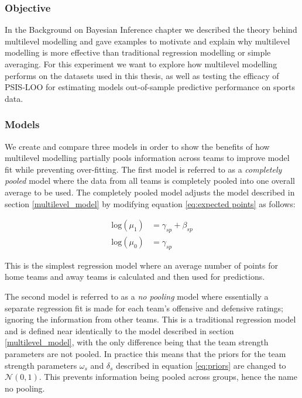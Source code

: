\subsubsection*{Objective}

In the Background on Bayesian Inference chapter we described the theory behind multilevel modelling and gave examples to motivate and explain why multilevel modelling is more effective than traditional regression modelling or simple averaging. For this experiment we want to explore how multilevel modelling performs on the datasets used in this thesis, as well as testing the efficacy of PSIS-LOO for estimating models out-of-sample predictive performance on sports data.

\subsubsection*{Models}

We create and compare three models in order to show the benefits of how multilevel modelling partially pools information across teams to improve model fit while preventing over-fitting. The first model is referred to as a \textit{completely pooled} model where the data from all teams is completely pooled into one overall average to be used. The completely pooled model adjusts the model described in section \ref{multilevel_model} by modifying equation \ref{eq:expected points} as follows:

\begin{equation} \label{eq:cp_model}
\begin{split}
\text{log}(\mu_{1}) &= \gamma_{sp} + \beta_{sp} \\
\text{log}(\mu_{0}) &= \gamma_{sp}
\end{split}
\end{equation}

This is the simplest regression model where an average number of points for home teams and away teams is calculated and then used for predictions.

The second model is referred to as a \textit{no pooling} model where essentially a separate regression fit is made for each team's offensive and defensive ratings; ignoring the information from other teams. This is a traditional regression model and is defined near identically to the model described in section \ref{multilevel_model}, with the only difference being that the team strength parameters are not pooled. In practice this means that the priors for the team strength parameters $\omega_s$ and $\delta_s$ described in equation \ref{eq:priors} are changed to $\mathcal{N}(0, 1)$. This prevents information being pooled across groups, hence the name no pooling.

